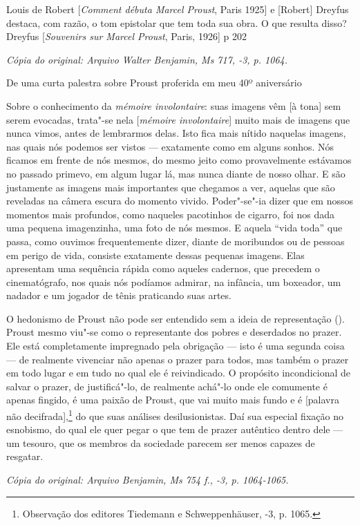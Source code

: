 Louis de Robert {[}\emph{Comment débuta Marcel Proust}, Paris 1925{]} e
{[}Robert{]} Dreyfus destaca, com razão, o tom epistolar que tem toda
sua obra. O que resulta disso? Dreyfus {[}\emph{Souvenirs sur Marcel
Proust}, Paris, 1926{]} p 202

\begin{flushright}
\emph{\small{Cópia do original: Arquivo Walter Benjamin, Ms 717, -3, p. 1064.}}
\end{flushright}

De uma curta palestra sobre Proust proferida em meu 40º aniversário

Sobre o conhecimento da \emph{mémoire involontaire}: suas imagens vêm
{[}à tona{]} sem serem evocadas, trata"-se nela {[}\emph{mémoire
involontaire}{]} muito mais de imagens que nunca vimos, antes de
lembrarmos delas. Isto fica mais nítido naquelas imagens, nas quais nós
podemos ser vistos --- exatamente como em alguns sonhos. Nós ficamos em
frente de nós mesmos, do mesmo jeito como provavelmente estávamos no
passado primevo, em algum lugar lá, mas nunca diante de nosso olhar. E
são justamente as imagens mais importantes que chegamos a ver, aquelas
que são reveladas na câmera escura do momento vivido. Poder"-se"-ia dizer
que em nossos momentos mais profundos, como naqueles pacotinhos de
cigarro, foi nos dada uma pequena imagenzinha, uma foto de nós mesmos. E
aquela ``vida toda'' que passa, como ouvimos frequentemente dizer,
diante de moribundos ou de pessoas em perigo de vida, consiste
exatamente dessas pequenas imagens. Elas apresentam uma sequência rápida
como aqueles cadernos, que precedem o cinematógrafo, nos quais nós
podíamos admirar, na infância, um boxeador, um nadador e um jogador de
tênis praticando suas artes.

O hedonismo de Proust não pode ser entendido sem a ideia de
representação (). Proust mesmo viu"-se como o representante dos pobres e
deserdados no prazer. Ele está completamente impregnado pela obrigação
--- isto é uma segunda coisa --- de realmente vivenciar não apenas o
prazer para todos, mas também o prazer em todo lugar e em tudo no qual
ele é reivindicado. O propósito incondicional de salvar o prazer, de
justificá"-lo, de realmente achá"-lo onde ele comumente é apenas fingido,
é uma paixão de Proust, que vai muito mais fundo e é {[}palavra não
decifrada{]},\footnote{Observação dos editores Tiedemann e
  Schweppenhäuser, -3, p. 1065. \versal{[N. E.]}} do que suas análises
desilusionistas. Daí sua especial fixação no esnobismo, do qual ele quer
pegar o que tem de prazer autêntico dentro dele --- um tesouro, que os
membros da sociedade parecem ser menos capazes de resgatar.

\begin{flushright}
\emph{\small{Cópia do original: Arquivo Benjamin, Ms 754 f., -3, p. 1064-1065.}}
\end{flushright}
